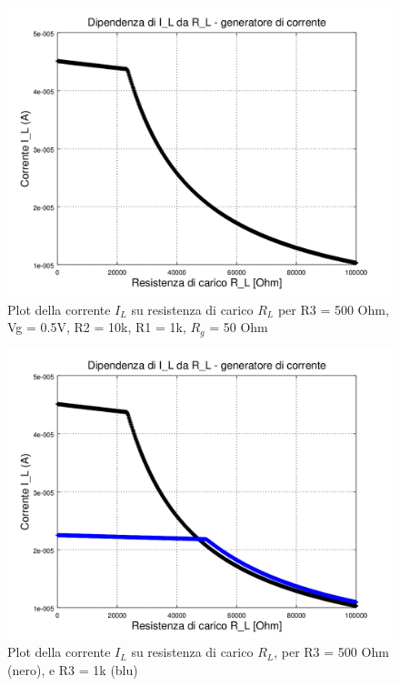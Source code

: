 \documentclass{beamer}
\begin{document}
\begin{frame}

{
\centering

\begin{figure}
\centering
\includegraphics[width=0.7\linewidth]{./corrente_carico_res_carico_R3_500}
\caption{Plot della corrente $I_L$ su resistenza di carico $R_L$ per R3 = 500 Ohm, Vg = 0.5V, R2 = 10k, R1 = 1k, $R_g$ = 50 Ohm}
\label{fig:corrente_carico_res_carico_R3_500}
\end{figure}

}
\end{frame}

\begin{frame}

{
\centering



\begin{figure}
\centering
\includegraphics[width=0.7\linewidth]{./corrente_carico_res_carico_R3_500-1k_linear}
\caption{Plot della corrente $I_L$ su resistenza di carico $R_L$, per R3 = 500 Ohm (nero), e R3 = 1k (blu)}
\label{fig:corrente_carico_res_carico_R3_500-1k_linear}
\end{figure}
}
\end{frame}
\end{document}
